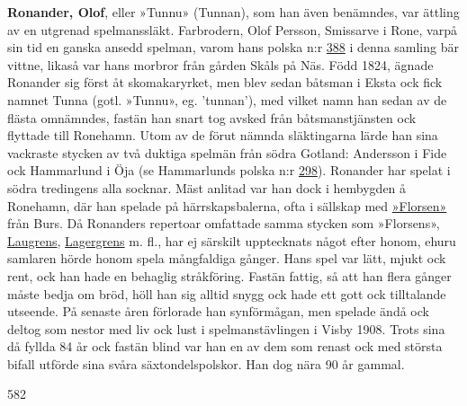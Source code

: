 \textbf{Ronander, Olof}, eller »Tunnu» (Tunnan), som han även benämndes, var ättling av en utgrenad spelmanssläkt.
Farbrodern, Olof Persson, Smissarve i Rone, varpå sin tid en ganska ansedd spelman, varom hans polska n:r \href{388}{388} i denna samling bär vittne, likaså var hans morbror från gården Skåls på Näs. Född 1824, ägnade Ronander sig först åt skomakaryrket, men blev sedan båtsman i Eksta ock fick namnet Tunna (gotl. »Tunnu», eg. 'tunnan'), med vilket namn han sedan av de flästa omnämndes, fastän han snart tog avsked från båtsmanstjänsten ock flyttade till Ronehamn. Utom av de förut nämnda släktingarna lärde han sina vackraste stycken av två duktiga spelmän från södra Gotland: Andersson i Fide ock Hammarlund i Öja (se Hammarlunds polska n:r \href{298}{298}). Ronander har spelat i södra tredingens alla socknar. Mäst anlitad var han
dock i hembygden å Ronehamn, där han spelade på härrskapsbalerna, ofta i sällskap med \href{Florsen}{»Florsen»} från Burs. Då Ronanders repertoar omfattade samma stycken som »Florsens», \href{Laugren}{Laugrens}, \href{Lagergren}{Lagergrens} m. fl., har ej särskilt upptecknats något efter honom, ehuru samlaren hörde honom spela mångfaldiga gånger. Hans spel var lätt, mjukt ock rent, ock han hade en behaglig stråkföring. Fastän fattig, så att han flera gånger måste bedja om bröd, höll han sig alltid snygg ock hade ett gott ock tilltalande utseende. På senaste åren förlorade han synförmågan, men spelade ändå ock deltog som nestor med liv ock lust i spelmanstävlingen i Visby 1908. Trots sina då fyllda 84 år ock fastän blind var han en av dem som renast ock med största bifall utförde sina svåra säxtondelspolskor. Han dog nära 90 år gammal. 

582 
